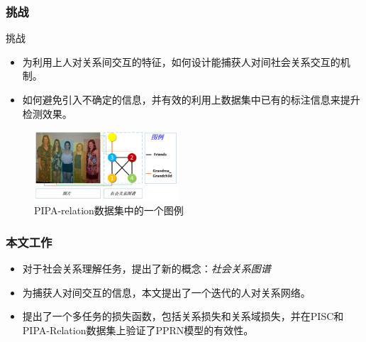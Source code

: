 \documentclass[UTF8]{beamer}
\begin{document}
\begin{frame}
\frametitle{挑战}
    \begin{block}{挑战}
        \begin{itemize}
            \item 为利用上人对关系间交互的特征，如何设计能捕获人对间社会关系交互的机制。
            \item 如何避免引入不确定的信息，并有效的利用上数据集中已有的标注信息来提升检测效果。
        \end{itemize}
    \end{block}
    \begin{figure}
        \centering
        \includegraphics[width=0.48\textwidth]{images/example-3.png}
        \caption{PIPA-relation\cite{sun2017a}数据集中的一个图例}
        \label{fig:example}
    \end{figure}
\end{frame}

\begin{frame}
    \frametitle{本文工作}

            \begin{itemize}
                \item 对于社会关系理解任务，提出了新的概念：{\it 社会关系图谱}
                \vspace*{1.5mm}
                \item 为捕获人对间交互的信息，本文提出了一个迭代的人对关系网络。
                \vspace*{1.5mm}
                \item 提出了一个多任务的损失函数，包括关系损失和关系域损失，并在PISC和PIPA-Relation数据集上验证了PPRN模型的有效性。
                \vspace*{1.5mm}
            \end{itemize}
\end{frame}
\end{document}
